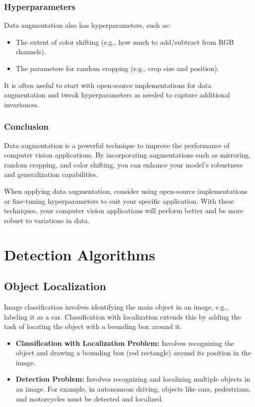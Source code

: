 \documentclass[letterpaper,12pt,notitlepage,twoside]{report}
\begin{document}
\subsubsection*{Hyperparameters}
Data augmentation also has hyperparameters, such as:
\begin{itemize}
    \item The extent of color shifting (e.g., how much to add/subtract from RGB channels).
    \item The parameters for random cropping (e.g., crop size and position).
\end{itemize}
It is often useful to start with open-source implementations for data augmentation and tweak hyperparameters as needed to capture additional invariances.

\subsubsection*{Conclusion}
Data augmentation is a powerful technique to improve the performance of computer vision applications. By incorporating augmentations such as mirroring, random cropping, and color shifting, you can enhance your model's robustness and generalization capabilities. 

When applying data augmentation, consider using open-source implementations or fine-tuning hyperparameters to suit your specific application. With these techniques, your computer vision applications will perform better and be more robust to variations in data.

\section{Detection Algorithms}

\subsection{Object Localization}
Image classification involves identifying the main object in an image, e.g., labeling it as a car. Classification with localization extends this by adding the task of locating the object with a bounding box around it.

\begin{itemize}
    \item \textbf{Classification with Localization Problem:} Involves recognizing the object and drawing a bounding box (red rectangle) around its position in the image.
    \item \textbf{Detection Problem:} Involves recognizing and localizing multiple objects in an image. For example, in autonomous driving, objects like cars, pedestrians, and motorcycles must be detected and localized.
\end{itemize}
\end{document}

